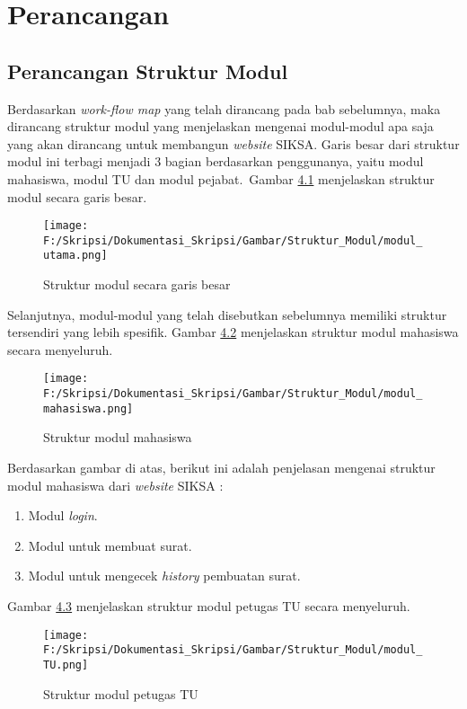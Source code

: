\chapter{Perancangan}
\label{chap:perancangan}

\section{Perancangan Struktur Modul}
\label{sec:perancangan_struktur_modul}
Berdasarkan \textit{work-flow map} yang telah dirancang pada bab sebelumnya, maka dirancang struktur modul yang menjelaskan mengenai modul-modul apa saja yang akan dirancang untuk membangun \textit{website} SIKSA. Garis besar dari struktur modul ini terbagi menjadi 3 bagian berdasarkan penggunanya, yaitu modul mahasiswa, modul TU dan modul pejabat.\
Gambar \hyperlink{struktur_modul_garis_besar}{4.1} menjelaskan struktur modul secara garis besar.

\begin{figure}[H]
	\centering
		\texttt{[image: F:/Skripsi/Dokumentasi\_Skripsi/Gambar/Struktur\_Modul/modul\_utama.png]}
	\caption{Struktur modul secara garis besar}
	\label{fig:struktur_modul_garis_besar}
\end{figure}

Selanjutnya, modul-modul yang telah disebutkan sebelumnya memiliki struktur tersendiri yang lebih spesifik. Gambar \hyperlink{struktur_modul_mahasiswa}{4.2} menjelaskan struktur modul mahasiswa secara menyeluruh.

\begin{figure}[H]
	\centering
		\texttt{[image: F:/Skripsi/Dokumentasi\_Skripsi/Gambar/Struktur\_Modul/modul\_mahasiswa.png]}
	\caption{Struktur modul mahasiswa}
	\label{fig:struktur_modul_mahasiswa}
\end{figure}

Berdasarkan gambar di atas, berikut ini adalah penjelasan mengenai struktur modul mahasiswa dari \textit{website} SIKSA :
\begin{enumerate}
	\item Modul \textit{login}.
	\item Modul untuk membuat surat.
	\item Modul untuk mengecek \textit{history} pembuatan surat.
\end{enumerate}

Gambar \hyperlink{struktur_modul_tu}{4.3} menjelaskan struktur modul petugas TU secara menyeluruh.

\begin{figure}[H]
	\centering
		\texttt{[image: F:/Skripsi/Dokumentasi\_Skripsi/Gambar/Struktur\_Modul/modul\_TU.png]}
	\caption{Struktur modul petugas TU}
	\label{fig:struktur_modul_TU}
\end{figure}


